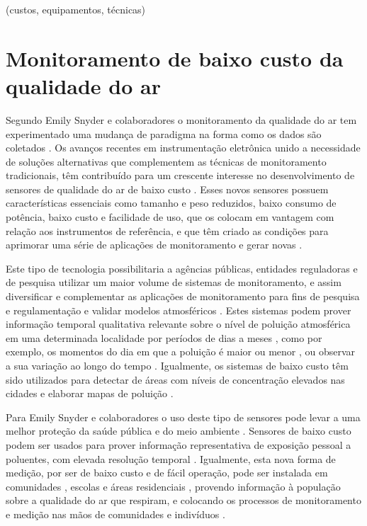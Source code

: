 (custos, equipamentos, técnicas)

\section{Monitoramento de baixo custo da qualidade do ar}\label{section:low-cost-air-quality-monit}


Segundo Emily Snyder e colaboradores  o monitoramento da qualidade do ar tem experimentado uma mudança de paradigma na forma como os dados são coletados \cite{Snyder2013}. Os avanços recentes em instrumentação eletrônica unido a necessidade de soluções alternativas que complementem as técnicas de monitoramento tradicionais, têm contribuído para um crescente interesse no desenvolvimento de sensores de qualidade do ar de baixo custo \cite{Kumar2015,Lewis2018Low-costApplications}. Esses novos sensores possuem características essenciais como tamanho e peso reduzidos, baixo consumo de potência, baixo custo e facilidade de uso, que os colocam em vantagem com relação aos instrumentos de referência, e que têm criado as condições para aprimorar uma série de aplicações de monitoramento e gerar novas \cite{Snyder2013,Lewis2018Low-costApplications}.

Este tipo de tecnologia possibilitaria a agências públicas, entidades reguladoras e de pesquisa utilizar um maior volume de sistemas de monitoramento, e assim diversificar e complementar as aplicações de monitoramento para fins de pesquisa e regulamentação e validar modelos atmosféricos \cite{Lewis2018Low-costApplications}. Estes sistemas podem prover informação temporal qualitativa relevante sobre o nível de poluição atmosférica em uma determinada localidade por períodos de dias a meses \cite{Castell2018LocalizedNodes}, como por exemplo, os momentos do dia em que a poluição é maior ou menor \cite{Zimmerman2018AMonitoring}, ou observar a sua variação ao longo do tempo \cite{Castell2017CanEstimates}. Igualmente, os sistemas de baixo custo têm sido utilizados para detectar de áreas com níveis de concentração elevados nas cidades \cite{Mead2013TheNetworks} e elaborar mapas de poluição \cite{Huang2019EstimatingMeasurements}.

Para Emily Snyder e colaboradores o uso deste tipo de sensores pode levar a uma melhor proteção da saúde pública e do meio ambiente \cite{Snyder2013}. Sensores de baixo custo podem ser usados para prover informação representativa de exposição pessoal a poluentes, com elevada resolução temporal \cite{Mead2013TheNetworks,Jerrett2017ValidatingScience}. Igualmente, esta nova forma de medição, por ser de baixo custo e de fácil operação, pode ser instalada em comunidades \cite{Mahajan2020APollution}, escolas e áreas residenciais \cite{Castell2018LocalizedNodes}, provendo informação à população sobre a qualidade do ar que respiram, e colocando os processos de monitoramento e medição nas mãos de comunidades e indivíduos \cite{Lewis2018Low-costApplications}.

